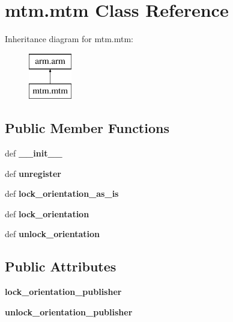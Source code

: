 \hypertarget{classmtm_1_1mtm}{\section{mtm.\-mtm Class Reference}
\label{classmtm_1_1mtm}
}
Inheritance diagram for mtm.\-mtm\-:\begin{figure}[H]
\begin{center}
\leavevmode
\includegraphics[height=2.000000cm]{classmtm_1_1mtm}
\end{center}
\end{figure}
\subsection*{Public Member Functions}
\begin{DoxyCompactItemize}
\item 
\hypertarget{classmtm_1_1mtm_a7bc909df85ca3bc9f6fc75eca32bafe6}{def {\bfseries \-\_\-\-\_\-init\-\_\-\-\_\-}}\label{classmtm_1_1mtm_a7bc909df85ca3bc9f6fc75eca32bafe6}

\item 
\hypertarget{classmtm_1_1mtm_a45de9466c32810b8670e724527c100a7}{def {\bfseries unregister}}\label{classmtm_1_1mtm_a45de9466c32810b8670e724527c100a7}

\item 
\hypertarget{classmtm_1_1mtm_a0e39b47e613b060621e483090edabeaa}{def {\bfseries lock\-\_\-orientation\-\_\-as\-\_\-is}}\label{classmtm_1_1mtm_a0e39b47e613b060621e483090edabeaa}

\item 
\hypertarget{classmtm_1_1mtm_a027de16f78002ef6d6b0e7d0af887ba1}{def {\bfseries lock\-\_\-orientation}}\label{classmtm_1_1mtm_a027de16f78002ef6d6b0e7d0af887ba1}

\item 
\hypertarget{classmtm_1_1mtm_ae69bc9cd377cf8c5a6af0ab451a0aa32}{def {\bfseries unlock\-\_\-orientation}}\label{classmtm_1_1mtm_ae69bc9cd377cf8c5a6af0ab451a0aa32}

\end{DoxyCompactItemize}
\subsection*{Public Attributes}
\begin{DoxyCompactItemize}
\item 
\hypertarget{classmtm_1_1mtm_a51dd418527ef857a52295ccf74a876b2}{{\bfseries lock\-\_\-orientation\-\_\-publisher}}\label{classmtm_1_1mtm_a51dd418527ef857a52295ccf74a876b2}

\item 
\hypertarget{classmtm_1_1mtm_a8fda57c86f322f0dec30eb5ab40fd714}{{\bfseries unlock\-\_\-orientation\-\_\-publisher}}\label{classmtm_1_1mtm_a8fda57c86f322f0dec30eb5ab40fd714}

\end{DoxyCompactItemize}


